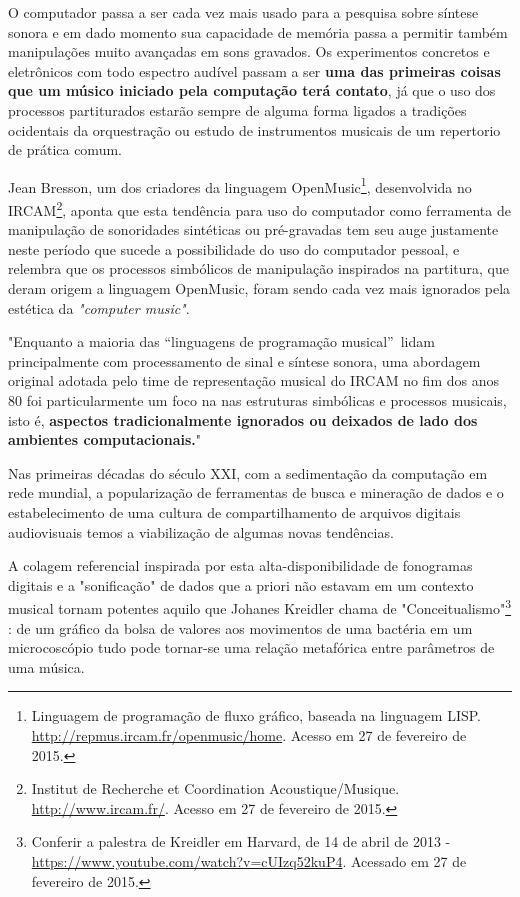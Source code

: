 \documentclass[
	12pt,				%
	openright,			%
	twoside,			%
	a4paper,			%
	english,			%
	french,				%
	spanish,			%
	brazil				%
	]{abntex2}
\begin{document}
O computador passa a ser cada vez mais usado para a pesquisa sobre síntese sonora e em dado momento sua capacidade de memória passa a permitir também manipulações muito avançadas em sons gravados. Os experimentos concretos e eletrônicos com todo espectro audível passam a ser \textbf{uma das primeiras coisas que um músico iniciado pela computação terá contato}, já que o uso dos processos partiturados estarão sempre de alguma forma ligados a tradições ocidentais da orquestração ou estudo de instrumentos musicais de um repertorio de prática comum.

Jean Bresson, um dos criadores da linguagem OpenMusic\footnote{Linguagem de programação de fluxo gráfico, baseada na linguagem LISP. \url{http://repmus.ircam.fr/openmusic/home}. Acesso em 27 de fevereiro de 2015.}, desenvolvida no IRCAM\footnote{Institut de Recherche et Coordination Acoustique/Musique. \url{http://www.ircam.fr/}. Acesso em 27 de fevereiro de 2015.}, aponta que esta tendência para uso do computador como ferramenta de manipulação de sonoridades sintéticas ou pré-gravadas tem seu auge justamente neste período que sucede a possibilidade do uso do computador pessoal, e relembra que os processos simbólicos de manipulação inspirados na partitura, que deram origem a linguagem OpenMusic, foram sendo cada vez mais ignorados pela estética da \textit{"computer music"}.


\begin{citacao}
"Enquanto a maioria das “linguagens de programação musical”\ lidam principalmente com processamento de sinal e síntese sonora, uma abordagem original adotada pelo time de representação musical do IRCAM no fim dos anos 80 foi particularmente um foco na nas estruturas simbólicas e processos musicais, isto é, \textbf{aspectos tradicionalmente ignorados ou deixados de lado dos ambientes computacionais.}"\ \cite[ grifo nosso]{bresson2011openmusic}
\end{citacao}

Nas primeiras décadas do século XXI, com a sedimentação da computação em rede mundial, a popularização de ferramentas de busca e mineração de dados e o estabelecimento de uma cultura de compartilhamento de arquivos digitais audiovisuais temos a viabilização de algumas novas tendências.

A colagem referencial inspirada por esta alta-disponibilidade de fonogramas digitais e a "sonificação" de dados que a priori não estavam em um contexto musical tornam potentes aquilo que Johanes Kreidler chama de "Conceitualismo"\footnote{Conferir a palestra de Kreidler em Harvard, de 14 de abril de 2013 - \url{https://www.youtube.com/watch?v=cUIzq52kuP4}. Acessado em 27 de fevereiro de 2015.} : de um gráfico da bolsa de valores aos movimentos de uma bactéria em um microcoscópio tudo pode tornar-se uma relação metafórica entre parâmetros de uma música.
\end{document}

